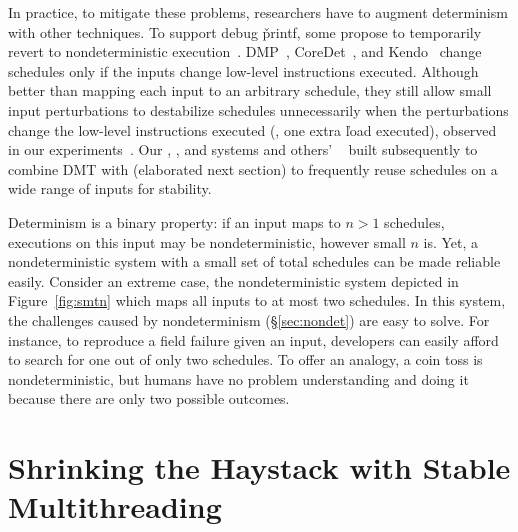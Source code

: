 In practice, to mitigate these problems, researchers have to augment
determinism with other techniques.  To support debug \v{printf}, some
propose to temporarily revert to nondeterministic
execution~\cite{dmp:asplos09}.  DMP~\cite{dmp:asplos09},
CoreDet~\cite{coredet:asplos10}, and Kendo~\cite{kendo:asplos09} change
schedules only if the inputs change low-level instructions executed.
Although better than mapping each input to an arbitrary schedule, they
still allow small input perturbations to destabilize schedules
unnecessarily when the perturbations change the low-level instructions
executed (\eg, one extra \v{load} executed), observed in our
experiments~\cite{cui:tern:osdi10}. Our \tern, \peregrine, and \parrot systems
and others' \dthreads~\cite{dthreads:sosp11} built subsequently to \tern combine
DMT with \smt (elaborated next section) to frequently reuse schedules on a
wide range of inputs for stability.

 Determinism
is a binary property: if an input maps to $n > 1$ schedules, executions on this
input may be nondeterministic, however small $n$ is.  Yet, a nondeterministic
system with a small set of total schedules can be made reliable easily. 
Consider an extreme case, the nondeterministic system depicted in
Figure~\ref{fig:smtn} which maps all inputs to at most two schedules.  In this
system, the challenges caused by nondeterminism (\S\ref{sec:nondet}) are
easy to solve.  For instance, to reproduce a field failure given an input,
developers can easily afford to search for one out of only two schedules.
To offer an analogy, a coin toss is nondeterministic, but humans have
no problem understanding and doing it because there are only two possible
outcomes.


\section{Shrinking the Haystack with Stable Multithreading}
\label{sec:smt-potential}

